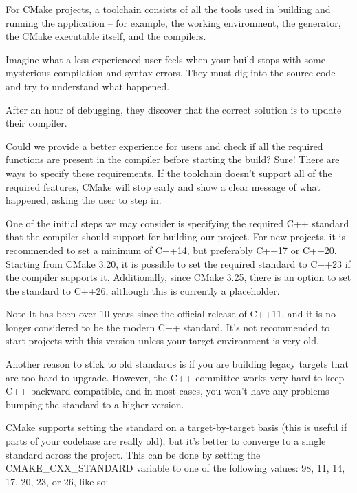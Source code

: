 For CMake projects, a toolchain consists of all the tools used in building and running the application – for example, the working environment, the generator, the CMake executable itself, and the compilers.

Imagine what a less-experienced user feels when your build stops with some mysterious compilation and syntax errors. They must dig into the source code and try to understand what happened.

After an hour of debugging, they discover that the correct solution is to update their compiler.

Could we provide a better experience for users and check if all the required functions are present in the compiler before starting the build? Sure! There are ways to specify these requirements. If the toolchain doesn’t support all of the required features, CMake will stop early and show a clear message of what happened, asking the user to step in.


One of the initial steps we may consider is specifying the required C++ standard that the compiler should support for building our project. For new projects, it is recommended to set a minimum of C++14, but preferably C++17 or C++20. Starting from CMake 3.20, it is possible to set the required standard to C++23 if the compiler supports it. Additionally, since CMake 3.25, there is an option to set the standard to C++26, although this is currently a placeholder.

\begin{myNotic}{Note}
It has been over 10 years since the official release of C++11, and it is no longer considered to be the modern C++ standard. It’s not recommended to start projects with this version unless your target environment is very old.
\end{myNotic}

Another reason to stick to old standards is if you are building legacy targets that are too hard to upgrade. However, the C++ committee works very hard to keep C++ backward compatible, and in most cases, you won’t have any problems bumping the standard to a higher version.

CMake supports setting the standard on a target-by-target basis (this is useful if parts of your codebase are really old), but it’s better to converge to a single standard across the project. This can be done by setting the CMAKE\_CXX\_STANDARD variable to one of the following values: 98, 11, 14, 17, 20, 23, or 26, like so:

